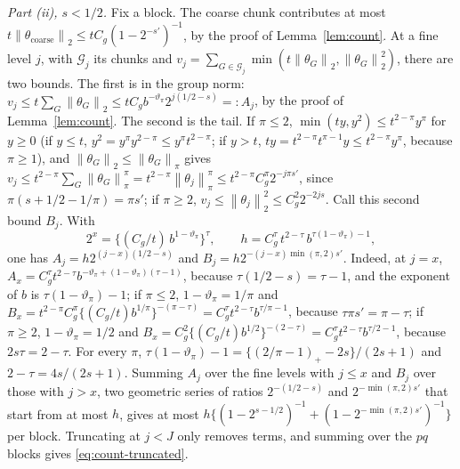 \documentclass[10pt]{book}
\theoremstyle{definition}
\newcommand{\norm}[1]{\left\lVert #1 \right\rVert}
\newcommand{\lev}{j}
\newcommand{\seff}{s'}
\newcommand{\Gcal}{\mathcal{G}}
\begin{document}
{\emph{Part (ii), $s < 1/2$.} Fix a block. The coarse chunk contributes at most
$t\norm{\theta_{\mathrm{coarse}}}_{2} \le tC_g(1-2^{-\seff})^{-1}$, by the
proof of Lemma~\ref{lem:count}. At a fine level $\lev$, with $\Gcal_{\lev}$
its chunks and $v_{\lev} = \sum_{G\in\Gcal_{\lev}}\min(t\norm{\theta_{G}}_{2},
\norm{\theta_{G}}_{2}^{2})$, there are two bounds. The first is in the group
norm: $v_{\lev} \le t\sum_{G}\norm{\theta_{G}}_{2} \le
tC_gb^{-\vartheta_{\pi}}2^{\lev(1/2-s)} =: A_{\lev}$, by the proof of
Lemma~\ref{lem:count}. The second is the tail. If $\pi \le 2$,
$\min(ty,y^{2}) \le t^{2-\pi}y^{\pi}$ for $y \ge 0$ (if $y \le t$,
$y^{2} = y^{\pi}y^{2-\pi} \le y^{\pi}t^{2-\pi}$; if $y > t$,
$ty = t^{2-\pi}t^{\pi-1}y \le t^{2-\pi}y^{\pi}$, because $\pi \ge 1$), and
$\norm{\theta_{G}}_{2} \le \norm{\theta_{G}}_{\pi}$ gives
$v_{\lev} \le t^{2-\pi}\sum_{G}\norm{\theta_{G}}_{\pi}^{\pi} =
t^{2-\pi}\norm{\theta_{\lev}}_{\pi}^{\pi} \le
t^{2-\pi}C_g^{\pi}2^{-\lev\pi\seff}$, since $\pi(s+1/2-1/\pi) = \pi\seff$; if
$\pi \ge 2$, $v_{\lev} \le \norm{\theta_{\lev}}_{2}^{2} \le C_g^{2}2^{-2\lev s}$.
Call this second bound $B_{\lev}$. With
\[
  2^{x} = \bigl\{(C_g/t)\,b^{1-\vartheta_{\pi}}\bigr\}^{\tau},
  \qquad
  h = C_g^{\tau}\,t^{2-\tau}\,b^{\tau(1-\vartheta_{\pi})-1},
\]
one has $A_{\lev} = h2^{(\lev-x)(1/2-s)}$ and
$B_{\lev} = h2^{-(\lev-x)\min(\pi,2)\seff}$. Indeed, at $\lev = x$,
$A_{x} = C_g^{\tau}t^{2-\tau}b^{-\vartheta_{\pi}+(1-\vartheta_{\pi})(\tau-1)}$,
because $\tau(1/2-s) = \tau-1$, and the exponent of $b$ is
$\tau(1-\vartheta_{\pi})-1$; if $\pi \le 2$, $1-\vartheta_{\pi} = 1/\pi$ and
$B_{x} = t^{2-\pi}C_g^{\pi}\{(C_g/t)b^{1/\pi}\}^{-(\pi-\tau)} =
C_g^{\tau}t^{2-\tau}b^{\tau/\pi-1}$, because $\tau\pi\seff = \pi-\tau$; if
$\pi \ge 2$, $1-\vartheta_{\pi} = 1/2$ and
$B_{x} = C_g^{2}\{(C_g/t)b^{1/2}\}^{-(2-\tau)} =
C_g^{\tau}t^{2-\tau}b^{\tau/2-1}$, because $2s\tau = 2-\tau$. For every $\pi$,
$\tau(1-\vartheta_{\pi})-1 = \{(2/\pi-1)_{+}-2s\}/(2s+1)$ and
$2-\tau = 4s/(2s+1)$. Summing $A_{\lev}$ over the fine levels with
$\lev \le x$ and $B_{\lev}$ over those with $\lev > x$, two geometric series
of ratios $2^{-(1/2-s)}$ and $2^{-\min(\pi,2)\seff}$ that start from at most
$h$, gives at most $h\{(1-2^{s-1/2})^{-1} + (1-2^{-\min(\pi,2)\seff})^{-1}\}$
per block. Truncating at $\lev < J$ only removes terms, and summing over the
$pq$ blocks gives \eqref{eq:count-truncated}.

}
\end{document}
